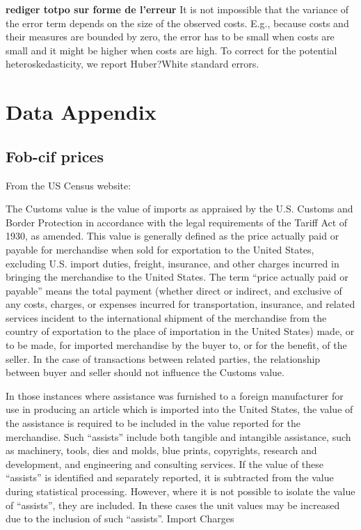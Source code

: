 \documentclass[a4paper,11pt]{article}
\begin{document}
\bigskip
\textbf{rediger totpo sur forme de l'erreur}
It is not impossible that the variance of the error term depends on the size of the observed costs. E.g., because costs and their measures are bounded by zero, the error has to be small when costs are small and it might be higher when costs are high. To correct for the potential heteroskedasticity, we report Huber?White standard errors.




\appendix

\section{Data Appendix \label{app:data}}

\subsection{Fob-cif prices}
From the US Census website:

The Customs value is the value of imports as appraised by the U.S. Customs and Border Protection in accordance with the legal requirements of the Tariff Act of 1930, as amended. This value is generally defined as the price actually paid or payable for merchandise when sold for exportation to the United States, excluding U.S. import duties, freight, insurance, and other charges incurred in bringing the merchandise to the United States. The term ``price actually paid or payable'' means the total payment (whether direct or indirect, and exclusive of any costs, charges, or expenses incurred for transportation, insurance, and related services incident to the international shipment of the merchandise from the country of exportation to the place of importation in the United States) made, or to be made, for imported merchandise by the buyer to, or for the benefit, of the seller. In the case of transactions between related parties, the relationship between buyer and seller should not influence the Customs value.

In those instances where assistance was furnished to a foreign manufacturer for use in producing an article which is imported into the United States, the value of the assistance is required to be included in the value reported for the merchandise. Such ``assists'' include both tangible and intangible assistance, such as machinery, tools, dies and molds, blue prints, copyrights, research and development, and engineering and consulting services. If the value of these ``assists'' is identified and separately reported, it is subtracted from the value during statistical processing. However, where it is not possible to isolate the value of ``assists'', they are included. In these cases the unit values may be increased due to the inclusion of such ``assists''.
Import Charges
\end{document}
